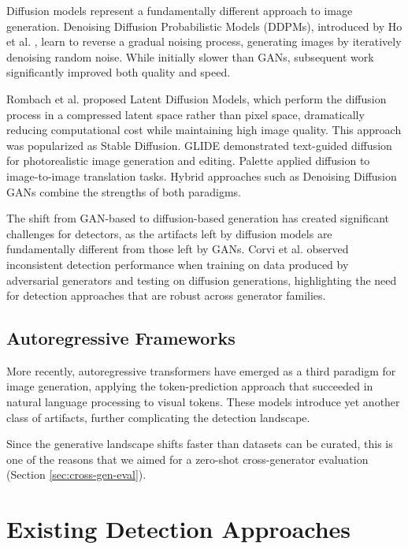 \documentclass[12pt,a4paper]{book}
\theoremstyle{definition}
\theoremstyle{remark}
\begin{document}
Diffusion models represent a fundamentally different approach to image generation. Denoising Diffusion Probabilistic Models (DDPMs), introduced by Ho et al. \cite{ho2020ddpm}, learn to reverse a gradual noising process, generating images by iteratively denoising random noise. While initially slower than GANs, subsequent work significantly improved both quality and speed.

Rombach et al. \cite{rombach2022high} proposed Latent Diffusion Models, which perform the diffusion process in a compressed latent space rather than pixel space, dramatically reducing computational cost while maintaining high image quality. This approach was popularized as Stable Diffusion. GLIDE \cite{nichol2022glide} demonstrated text-guided diffusion for photorealistic image generation and editing. Palette \cite{saharia2022palette} applied diffusion to image-to-image translation tasks. Hybrid approaches such as Denoising Diffusion GANs \cite{xiao2022ddgan} combine the strengths of both paradigms.

The shift from GAN-based to diffusion-based generation has created significant challenges for detectors, as the artifacts left by diffusion models are fundamentally different from those left by GANs. Corvi et al. \cite{corvi2023detection} observed inconsistent detection performance when training on data produced by adversarial generators and testing on diffusion generations, highlighting the need for detection approaches that are robust across generator families.


\subsection{Autoregressive Frameworks}\label{sec:autoregressive}

More recently, autoregressive transformers have emerged as a third paradigm for image generation, applying the token-prediction approach that succeeded in natural language processing to visual tokens. These models introduce yet another class of artifacts, further complicating the detection landscape.

Since the generative landscape shifts faster than datasets can be curated, this is one of the reasons that we aimed for a zero-shot cross-generator evaluation (Section \ref{sec:cross-gen-eval}).


\section{Existing Detection Approaches}\label{sec:detection-approaches}
\end{document}
